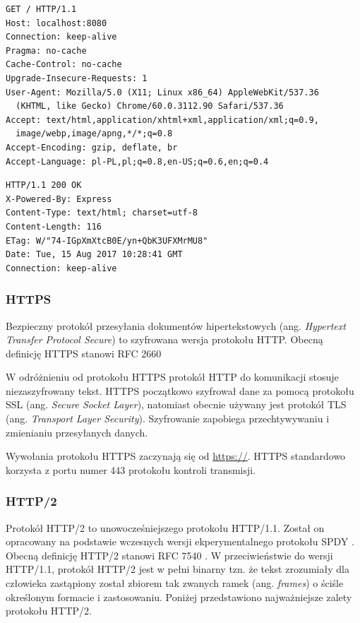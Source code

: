 \documentclass[polish, twoside, 12pt]{mwart}
\begin{document}
\begin{lstlisting}[caption=Przykładowe żądanie HTTP/1.1,]
GET / HTTP/1.1
Host: localhost:8080
Connection: keep-alive
Pragma: no-cache
Cache-Control: no-cache
Upgrade-Insecure-Requests: 1
User-Agent: Mozilla/5.0 (X11; Linux x86_64) AppleWebKit/537.36 
  (KHTML, like Gecko) Chrome/60.0.3112.90 Safari/537.36
Accept: text/html,application/xhtml+xml,application/xml;q=0.9,
  image/webp,image/apng,*/*;q=0.8
Accept-Encoding: gzip, deflate, br
Accept-Language: pl-PL,pl;q=0.8,en-US;q=0.6,en;q=0.4
\end{lstlisting}

\begin{lstlisting}[caption=Przykładowa odpowiedź HTTP/1.1]
HTTP/1.1 200 OK
X-Powered-By: Express
Content-Type: text/html; charset=utf-8
Content-Length: 116
ETag: W/"74-IGpXmXtcB0E/yn+QbK3UFXMrMU8"
Date: Tue, 15 Aug 2017 10:28:41 GMT
Connection: keep-alive
\end{lstlisting}

\subsubsection{HTTPS} \label{https}

Bezpieczny protokół przesyłania dokumentów hipertekstowych (ang. \emph{Hypertext Transfer Protocol Secure}) to szyfrowana wersja protokołu HTTP. Obecną definicję HTTPS stanowi RFC 2660 \cite{rfc2660}

W odróżnieniu od protokołu HTTPS protokół HTTP do komunikacji stosuje niezaszyfrowany tekst. HTTPS początkowo szyfrował dane za pomocą protokołu SSL (ang. \emph{Secure Socket Layer}), natomiast obecnie używany jest protokół TLS (ang. \emph{Transport Layer Security}). Szyfrowanie zapobiega przechtywywaniu i zmienianiu przesyłanych danych. 

Wywołania protokołu HTTPS zaczynają się od \url{https://}. HTTPS standardowo korzysta z portu numer 443 protokołu kontroli transmisji. 

\subsubsection{HTTP/2} \label{http/2}

Protokół HTTP/2 to unowocześniejszego protokołu HTTP/1.1. Został on opracowany na podstawie wczesnych wersji ekperymentalnego protokołu SPDY \cite{spdy}. Obecną definicję HTTP/2 stanowi RFC 7540 \cite{rfc7540}. W przeciwieństwie do wersji HTTP/1.1, protokół HTTP/2 jest w pełni binarny tzn. że tekst zrozumiały dla człowieka zastąpiony został zbiorem tak zwanych ramek (ang. \emph{frames}) o ściśle określonym formacie i zastosowaniu. Poniżej przedstawiono najważniejsze zalety protokołu HTTP/2.
\end{document}
